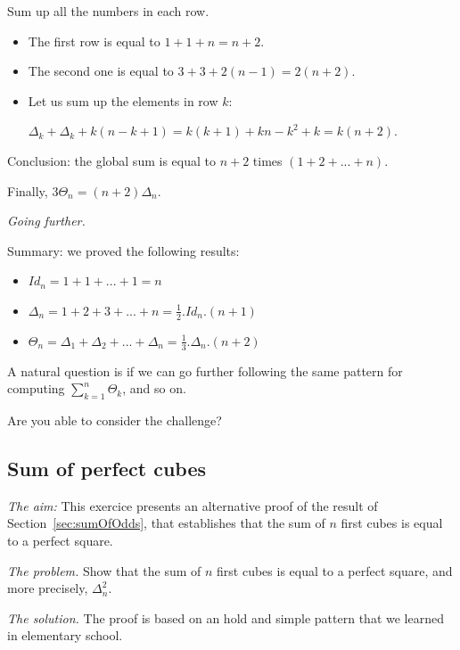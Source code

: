 Sum up all the numbers in each row.

\begin{itemize}
\item 
The first row is equal to $1+1+n = n+2$.
\item
The second one is equal to $3 + 3 + 2(n-1) = 2(n+2)$. 
\item
Let us sum up the elements in row $k$: 

$\Delta_k + \Delta_k + k(n-k+1)  = k(k+1) + kn-k^2+k = k(n+2)$.
\end{itemize}

Conclusion:
the global sum is equal to $n+2$ times $(1+2+...+n)$.

Finally, $3 \Theta_n = (n+2) \Delta_n$.
\medskip

\noindent \textit{Going further.}

Summary: we proved the following results:
\begin{itemize}
\item $Id_n = 1+1+ ... +1 = n$
\item $\Delta_n = 1+2+3+ ... +n = \frac{1}{2}.Id_n.(n+1)$
\item $\Theta_n = \Delta_1 + \Delta_2 + ... + \Delta_n = \frac{1}{3} .\Delta_n.(n+2)$
\end{itemize}

A natural question is if we can go further following the same pattern for computing 
$ \sum_{k=1}^{n} \Theta_k$, and so on.

Are you able to consider the challenge?


\subsection{Sum of perfect cubes}

\noindent \textit{The aim:}
This exercice presents an alternative proof of the result of Section~\ref{sec:sumOfOdds},
that establishes that the sum of $n$ first cubes is equal to a perfect square.
\medskip

\noindent \textit{The problem.}
Show that the sum of $n$ first cubes is equal to a perfect square, and more precisely, $\Delta_n^2$.
\medskip

\noindent \textit{The solution.}
The proof is based on an hold and simple pattern that we learned in elementary school.
\medskip

